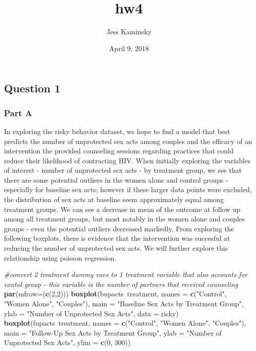 \documentclass[]{article}
\title{hw4}
\author{Jess Kaminsky}
\date{April 9, 2018}
\newenvironment{Shaded}{\begin{snugshade}}{\end{snugshade}}
\newcommand{\KeywordTok}[1]{\textcolor[rgb]{0.13,0.29,0.53}{\textbf{{#1}}}}
\newcommand{\DataTypeTok}[1]{\textcolor[rgb]{0.13,0.29,0.53}{{#1}}}
\newcommand{\DecValTok}[1]{\textcolor[rgb]{0.00,0.00,0.81}{{#1}}}
\newcommand{\StringTok}[1]{\textcolor[rgb]{0.31,0.60,0.02}{{#1}}}
\newcommand{\CommentTok}[1]{\textcolor[rgb]{0.56,0.35,0.01}{\textit{{#1}}}}
\newcommand{\NormalTok}[1]{{#1}}
\begin{document}
\maketitle

\subsection{Question 1}\label{question-1}

\subsubsection{Part A}\label{part-a}

In exploring the risky behavior dataset, we hope to find a model that
best predicts the number of unprotected sex acts among couples and the
efficacy of an intervention the provided counseling sessions regarding
practices that could reduce their likelihood of contracting HIV. When
initially exploring the variables of interest - number of unprotected
sex acts - by treatment group, we see that there are some potential
outliers in the women alone and control groups - especially for baseline
sex acts; however if these larger data points were excluded, the
distribution of sex acts at baseline seem approximately equal among
treatment groups. We can see a decrease in mean of the outcome at follow
up among all treatment groups, but most notably in the women alone and
couples groups - even the potential outliers decreased markedly. From
exploring the following boxplots, there is evidence that the
intervention was succesful at reducing the number of unprotected sex
acts. We will further explore this relationship using poisson
regression.

\begin{Shaded}
\begin{Highlighting}[]
\CommentTok{#convert 2 treatment dummy vars to 1 treatment variable that also accounts for contol group - this variable is the number of partners that received counseling}
\KeywordTok{par}\NormalTok{(}\DataTypeTok{mfrow=}\NormalTok{(}\KeywordTok{c}\NormalTok{(}\DecValTok{2}\NormalTok{,}\DecValTok{2}\NormalTok{)))}
\KeywordTok{boxplot}\NormalTok{(bupacts~treatment, }\DataTypeTok{names =} \KeywordTok{c}\NormalTok{(}\StringTok{"Control"}\NormalTok{, }\StringTok{"Women Alone"}\NormalTok{, }\StringTok{"Couples"}\NormalTok{), }\DataTypeTok{main =} \StringTok{"Baseline Sex Acts by Treatment Group"}\NormalTok{, }\DataTypeTok{ylab =} \StringTok{"Number of Unprotected Sex Acts"}\NormalTok{, }\DataTypeTok{data =} \NormalTok{risky)}
\KeywordTok{boxplot}\NormalTok{(fupacts~treatment, }\DataTypeTok{names =} \KeywordTok{c}\NormalTok{(}\StringTok{"Control"}\NormalTok{, }\StringTok{"Women Alone"}\NormalTok{, }\StringTok{"Couples"}\NormalTok{), }\DataTypeTok{main =} \StringTok{"Follow-Up Sex Acts by Treatment Group"}\NormalTok{, }\DataTypeTok{ylab =} \StringTok{"Number of Unprotected Sex Acts"}\NormalTok{, }\DataTypeTok{ylim =} \KeywordTok{c}\NormalTok{(}\DecValTok{0}\NormalTok{, }\DecValTok{300}\NormalTok{))}
\end{Highlighting}
\end{Shaded}
\end{document}
